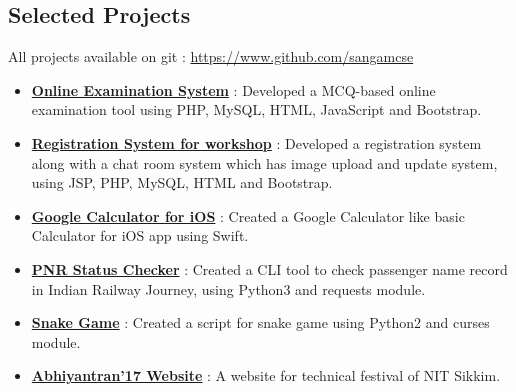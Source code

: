 \documentclass[margin, centered]{res}
\begin{document}
\begin{resume}
    \section{Selected Projects}
    All projects available on git : \url{https://www.github.com/sangamcse}
    \begin{itemize}[leftmargin=*]
        \item \textbf{\href{https://github.com/sangamcse/online-examination-system}{Online Examination System}} :
              Developed a MCQ-based online examination tool using PHP, MySQL, HTML, JavaScript and Bootstrap.
        \item \textbf{\href{https://github.com/sangamcse/registration-ESAD}{Registration System for workshop}} :
              Developed a registration system along with a chat room system which has image upload and update system,
              using JSP, PHP, MySQL, HTML and Bootstrap.
        \item \textbf{\href{https://github.com/sangamcse/calculator}{Google Calculator for iOS}} : Created a Google
              Calculator like basic Calculator for iOS app using Swift.
        \item \textbf{\href{https://github.com/sangamcse/myPNRStatus}{PNR Status Checker}} : Created a CLI tool
              to check passenger name record in Indian Railway Journey, using Python3 and requests module.
        \item \textbf{\href{https://github.com/sangamcse/Snake_game}{Snake Game}} : Created a script for snake game using
              Python2 and curses module.
        \item \textbf{\href{http://abhiyantran.nitsikkim.ac.in/abhiyantran-17/}{Abhiyantran'17 Website}} : A website for technical festival of NIT Sikkim.
    \end{itemize}



\end{resume}
\end{document}
